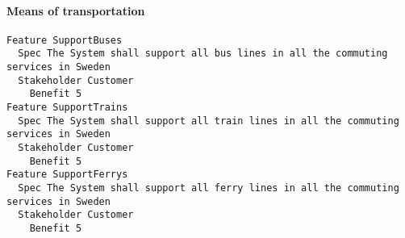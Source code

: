         
       \paragraph{Means of transportation}


\begin{lstlisting}
Feature SupportBuses
  Spec The System shall support all bus lines in all the commuting services in Sweden
  Stakeholder Customer
    Benefit 5
Feature SupportTrains
  Spec The System shall support all train lines in all the commuting services in Sweden
  Stakeholder Customer
    Benefit 5
Feature SupportFerrys
  Spec The System shall support all ferry lines in all the commuting services in Sweden
  Stakeholder Customer
    Benefit 5

\end{lstlisting}